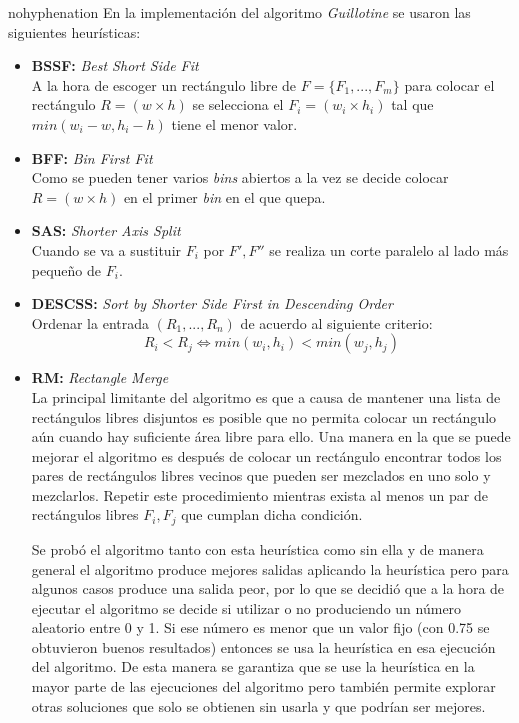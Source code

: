 \documentclass[a4paper,10pt,twocolumn]{article}
\begin{document}
\begin{hyphenrules}{nohyphenation}
En la implementación del algoritmo \textit{Guillotine} se usaron las siguientes heurísticas:
\begin{itemize}
	\item \textbf{BSSF:} \textit{Best Short Side Fit}\\
	A la hora de escoger un rectángulo libre de $F = \{F_1,...,F_m\}$ para colocar el rectángulo $R = (w \times h)$ se selecciona el $F_i = (w_i \times h_i)$ tal que $min(w_i-w,h_i-h)$ tiene el menor valor. 
	\item \textbf{BFF:} \textit{Bin First Fit}\\
	Como se pueden tener varios \textit{bins} abiertos a la vez se decide colocar $R = (w \times h)$ en el primer \textit{bin} en el que quepa.
	\item \textbf{SAS:} \textit{Shorter Axis Split}\\
	Cuando se va a sustituir $F_i$ por $F',F''$ se realiza un corte paralelo al lado más pequeño de $F_i$.
	\item \textbf{DESCSS:} \textit{Sort by Shorter Side First in Descending Order}\\
	Ordenar la entrada $(R_1,...,R_n)$ de acuerdo al siguiente criterio:
	$$R_i < R_j \Longleftrightarrow min(w_i,h_i) < min (w_j,h_j)$$ 
	\item \textbf{RM:} \textit{Rectangle Merge}\\
	La principal limitante del algoritmo es que a causa de mantener una lista de rectángulos libres disjuntos es posible que no permita colocar un rectángulo aún cuando hay suficiente área libre para ello. Una manera en la que se puede mejorar el algoritmo es después de colocar un rectángulo encontrar todos los pares de rectángulos libres vecinos que pueden ser mezclados en uno solo y mezclarlos. Repetir este procedimiento mientras exista al menos un par de rectángulos libres $F_i, F_j$ que cumplan dicha condición.
	
	Se probó el algoritmo tanto con esta heurística como sin ella y de manera general el algoritmo produce mejores salidas aplicando la heurística pero para algunos casos produce una salida peor, por lo que se decidió que a la hora de ejecutar el algoritmo se decide si utilizar o no produciendo un número aleatorio entre 0 y 1. Si ese número es menor que un valor fijo (con 0.75 se obtuvieron buenos resultados) entonces se usa la heurística en esa ejecución del algoritmo. De esta manera se garantiza que se use la heurística en la mayor parte de las ejecuciones del algoritmo pero también permite explorar otras soluciones que solo se obtienen sin usarla y que podrían ser mejores. 
\end{itemize}


\end{hyphenrules}
\end{document}
